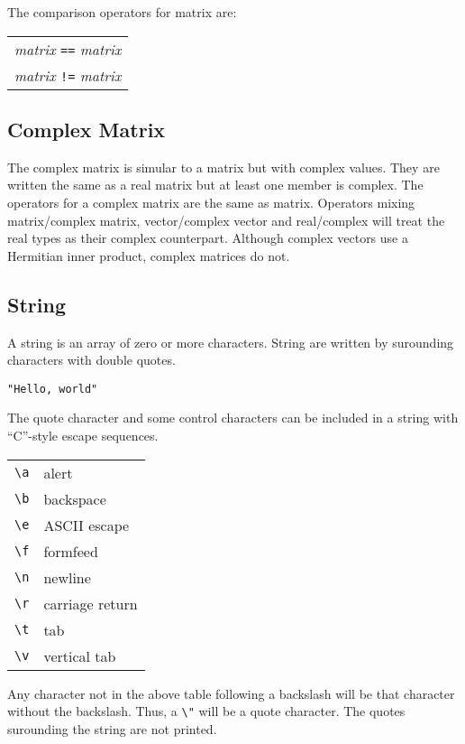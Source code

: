\documentclass{article}
\begin{document}
The comparison operators for matrix are:
\begin{center}
  \begin{tabular}{c}
    \emph{matrix} \verb|==| \emph{matrix} \\
    \emph{matrix} \verb|!=| \emph{matrix} \\
  \end{tabular}
\end{center}

\subsection{Complex Matrix}
The complex matrix is simular to a matrix but with complex values.
They are written the same as a real matrix but at least one member is complex.
The operators for a complex matrix are the same as matrix.
Operators mixing matrix/complex matrix, vector/complex vector and real/complex
will treat the real types as their complex counterpart.
Although complex vectors use a Hermitian inner product, complex matrices do not.

\subsection{String}
A string is an array of zero or more characters.
String are written by surounding characters with double quotes.
\begin{verbatim}
"Hello, world"
\end{verbatim}
The quote character and some control characters can be included
in a string with ``C''-style escape sequences.
\begin{center}
  \begin{tabular}{cl}
    \verb|\a| & alert \\
    \verb|\b| & backspace \\
    \verb|\e| & ASCII escape \\
    \verb|\f| & formfeed \\
    \verb|\n| & newline \\
    \verb|\r| & carriage return \\
    \verb|\t| & tab \\
    \verb|\v| & vertical tab \\
  \end{tabular}
\end{center}

Any character not in the above table following a backslash will be that
character without the backslash. Thus, a \verb|\"| will be a quote
character.
The quotes surounding the string are not printed.
\end{document}
